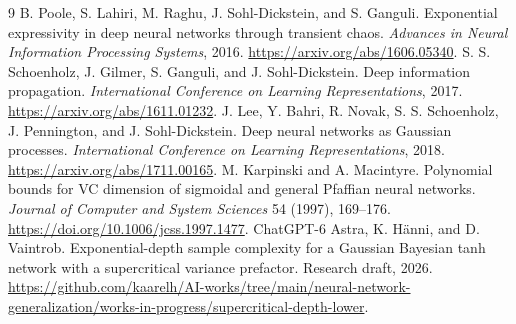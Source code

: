 \documentclass[11pt]{article}
\begin{document}
\begin{thebibliography}{9}
 B. Poole, S. Lahiri, M. Raghu, J. Sohl-Dickstein, and S. Ganguli. Exponential expressivity in deep neural networks through transient chaos. \emph{Advances in Neural Information Processing Systems}, 2016. \url{https://arxiv.org/abs/1606.05340}.
 S. S. Schoenholz, J. Gilmer, S. Ganguli, and J. Sohl-Dickstein. Deep information propagation. \emph{International Conference on Learning Representations}, 2017. \url{https://arxiv.org/abs/1611.01232}.
 J. Lee, Y. Bahri, R. Novak, S. S. Schoenholz, J. Pennington, and J. Sohl-Dickstein. Deep neural networks as Gaussian processes. \emph{International Conference on Learning Representations}, 2018. \url{https://arxiv.org/abs/1711.00165}.
 M. Karpinski and A. Macintyre. Polynomial bounds for VC dimension of sigmoidal and general Pfaffian neural networks. \emph{Journal of Computer and System Sciences} 54 (1997), 169--176. \url{https://doi.org/10.1006/jcss.1997.1477}.
 ChatGPT-6 Astra, K. H\"anni, and D. Vaintrob. Exponential-depth sample complexity for a Gaussian Bayesian tanh network with a supercritical variance prefactor. Research draft, 2026. \url{https://github.com/kaarelh/AI-works/tree/main/neural-network-generalization/works-in-progress/supercritical-depth-lower}.
\end{thebibliography}
\end{document}
